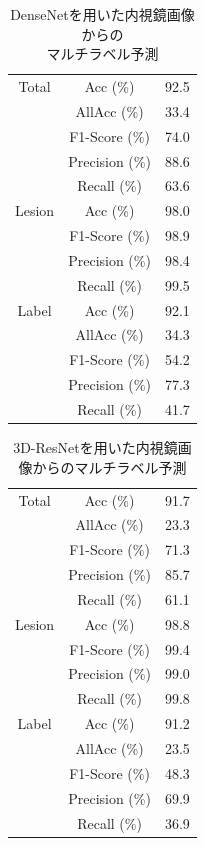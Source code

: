 \begin{table}[tb]
    \caption[]{DenseNetを用いた内視鏡画像からの\\マルチラベル予測}
    \label{tb:densenet161_e}
    \centering
    \normalsize
    \begin{tabular}{c|c|r} \hline
        Total & Acc (\%) & 92.5 \\ \cline{2-3}
         & AllAcc (\%) & 33.4 \\ \cline{2-3}
         & F1-Score (\%) & 74.0 \\ \cline{2-3}
         & Precision (\%) & 88.6 \\ \cline{2-3}
         & Recall (\%) & 63.6 \\ \hline
        Lesion & Acc (\%) & 98.0 \\ \cline{2-3}
         & F1-Score (\%) & 98.9 \\ \cline{2-3}
         & Precision (\%) & 98.4 \\ \cline{2-3}
         & Recall (\%) & 99.5 \\ \hline
        Label & Acc (\%) & 92.1 \\ \cline{2-3}
         & AllAcc (\%) & 34.3 \\ \cline{2-3}
         & F1-Score (\%) & 54.2 \\ \cline{2-3}
         & Precision (\%) & 77.3 \\ \cline{2-3}
         & Recall (\%) & 41.7 \\ \hline
    \end{tabular}
\end{table}

\begin{table}[tb]
    \caption[]{3D-ResNetを用いた内視鏡画像からのマルチラベル予測}
    \label{tb:resnet3d_e}
    \centering
    \normalsize
    \begin{tabular}{c|c|r} \hline
        Total & Acc (\%) & 91.7 \\ \cline{2-3}
         & AllAcc (\%) & 23.3 \\ \cline{2-3}
         & F1-Score (\%) & 71.3 \\ \cline{2-3}
         & Precision (\%) & 85.7 \\ \cline{2-3}
         & Recall (\%) & 61.1 \\ \hline
        Lesion & Acc (\%) & 98.8 \\ \cline{2-3}
         & F1-Score (\%) & 99.4 \\ \cline{2-3}
         & Precision (\%) & 99.0 \\ \cline{2-3}
         & Recall (\%) & 99.8 \\ \hline
        Label & Acc (\%) & 91.2 \\ \cline{2-3}
         & AllAcc (\%) & 23.5 \\ \cline{2-3}
         & F1-Score (\%) & 48.3 \\ \cline{2-3}
         & Precision (\%) & 69.9 \\ \cline{2-3}
         & Recall (\%) & 36.9 \\ \hline
    \end{tabular}
\end{table}

